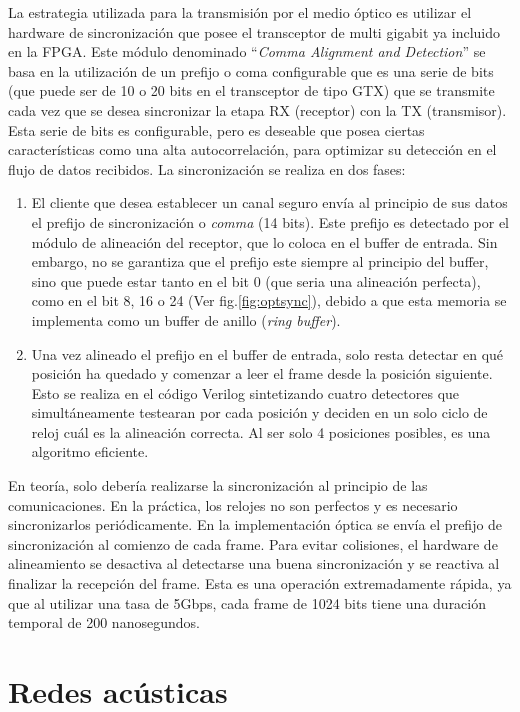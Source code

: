 La estrategia utilizada para la transmisión por el medio óptico es utilizar el hardware de sincronización que posee el transceptor de multi gigabit ya incluido en la FPGA. Este módulo \cite{ug198} denominado ``\textit{Comma Alignment and Detection}'' se basa en la utilización de un prefijo o coma configurable que es una serie de bits (que puede ser de 10 o 20 bits en el transceptor de tipo GTX) que se transmite cada vez que se desea sincronizar la etapa RX (receptor) con la TX (transmisor). Esta serie de bits es configurable, pero es deseable que posea ciertas características como una alta autocorrelación, para optimizar su detección en el flujo de datos recibidos.
La sincronización se realiza en dos fases:
\begin{enumerate}
 \item El cliente que desea establecer un canal seguro envía al principio de sus datos el prefijo de sincronización o \textit{comma} (14 bits). Este prefijo es detectado por el módulo de alineación del receptor, que lo coloca en el buffer de entrada. Sin embargo, no se garantiza que el prefijo este siempre al principio del buffer, sino que puede estar tanto en el bit 0 (que seria una alineación perfecta), como en el bit 8, 16 o 24 (Ver fig.\ref{fig:optsync}), debido a que esta memoria se implementa como un buffer de anillo (\textit{ring buffer}).
 \item Una vez alineado el prefijo en el buffer de entrada, solo resta detectar en qué posición ha quedado y comenzar a leer el frame desde la posición siguiente. Esto se realiza en el código Verilog sintetizando cuatro detectores que simultáneamente testearan por cada posición y deciden en un solo ciclo de reloj cuál es la alineación correcta. Al ser solo 4 posiciones posibles, es una algoritmo eficiente.
\end{enumerate}

En teoría, solo debería realizarse la sincronización al principio de las comunicaciones. En la práctica, los relojes no son perfectos y es necesario sincronizarlos periódicamente. En la implementación óptica se envía el prefijo de sincronización al comienzo de cada frame.
Para evitar colisiones, el hardware de alineamiento se desactiva al detectarse una buena sincronización y se reactiva al finalizar la recepción del frame. Esta es una operación extremadamente rápida, ya que al utilizar una tasa de 5Gbps, cada frame de 1024 bits tiene una duración temporal de 200 nanosegundos.

\section{Redes acústicas}
\label{redacus}

